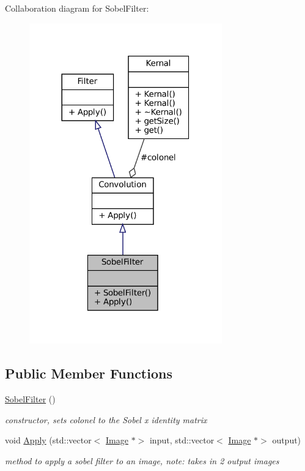 Collaboration diagram for Sobel\+Filter\+:
\nopagebreak
\begin{figure}[H]
\begin{center}
\leavevmode
\includegraphics[width=236pt]{classSobelFilter__coll__graph}
\end{center}
\end{figure}
\subsection*{Public Member Functions}
\begin{DoxyCompactItemize}
\item 
\mbox{\label{classSobelFilter_ae46218b3594451a1b5fbdf0ebbd7c688}} 
\hyperlink{classSobelFilter_ae46218b3594451a1b5fbdf0ebbd7c688}{Sobel\+Filter} ()
\begin{DoxyCompactList}\small\item\em constructor, sets colonel to the Sobel x identity matrix \end{DoxyCompactList}\item 
\mbox{\label{classSobelFilter_a9c8136932e8d9c7cb7dd785cf9dbfefe}} 
void \hyperlink{classSobelFilter_a9c8136932e8d9c7cb7dd785cf9dbfefe}{Apply} (std\+::vector$<$ \hyperlink{classImage}{Image} $\ast$$>$ input, std\+::vector$<$ \hyperlink{classImage}{Image} $\ast$$>$ output)
\begin{DoxyCompactList}\small\item\em method to apply a sobel filter to an image, note\+: takes in 2 output images \end{DoxyCompactList}\end{DoxyCompactItemize}
